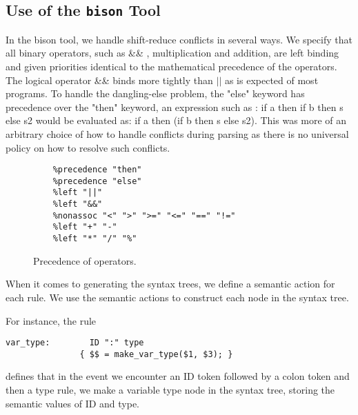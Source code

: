 \documentclass{article}
\begin{document}
\subsection{Use of the {\tt bison} Tool}
In the bison tool, we handle shift-reduce conflicts in several ways. We specify that all binary operators, such as \&\& , multiplication and addition, are left binding and given priorities identical to the mathematical precedence of the operators. The logical operator \&\& binds more tightly than $||$ as is expected of most programs. To handle the dangling-else problem, the "else" keyword has precedence over the "then" keyword, an expression such as : if a then if b then s else s2 would be evaluated as: if a then (if b then s else s2). This was more of an arbitrary choice of how to handle conflicts during parsing as there is no universal policy on how to resolve such conflicts.

\begin{figure}[h]
    \centering
    \begin{lstlisting}
    %precedence "then" 
    %precedence "else"
    %left "||"
    %left "&&"
    %nonassoc "<" ">" ">=" "<=" "==" "!="
    %left "+" "-" 
    %left "*" "/" "%"
    \end{lstlisting}
    \caption{Precedence of operators.}
    \label{fig:my_label}
\end{figure}

\newpage
When it comes to generating the syntax trees, we define a semantic action for each rule. We use the semantic actions to construct each node in the syntax tree.

For instance, the rule
\begin{lstlisting}
var_type:        ID ":" type
               { $$ = make_var_type($1, $3); }
\end{lstlisting}

defines that in the event we encounter an ID token followed by a colon token and then a type rule, we make a variable type node in the syntax tree, storing the semantic values of ID and type.
\newline
\newline
\end{document}
